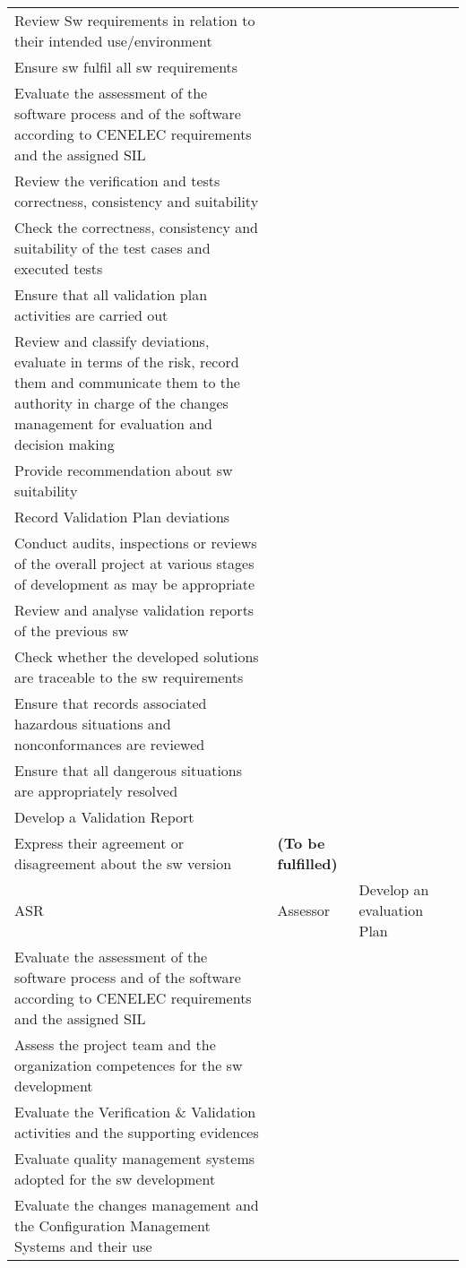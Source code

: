 \documentclass{template/openetcs_article}
\begin{document}
\begin{landscape}
\begin{appendices}
\begin{center}
\begin{longtable}{|m{1cm}|m{}|m{11cm}|m{10cm}|}
Review Sw requirements in relation to their intended use/environment\\
Ensure sw fulfil all sw requirements\\
Evaluate the assessment of the software process and of the software according to CENELEC requirements and the assigned SIL\\
Review the verification and tests correctness, consistency and suitability \\
Check the correctness, consistency and suitability of the test cases and executed tests\\
Ensure that all validation plan activities are carried out\\
Review and classify deviations, evaluate in terms of the risk, record them and communicate them to the authority in charge of the changes management for evaluation and decision making\\ 
Provide recommendation about sw suitability\\
Record Validation Plan deviations\\
Conduct audits, inspections or reviews of the overall project at various stages of development as may be appropriate\\
Review and analyse validation reports of the previous sw\\
Check whether the developed solutions are traceable to the sw requirements \\
Ensure that records associated hazardous situations and nonconformances are reviewed\\
Ensure that all dangerous situations are appropriately resolved\\
Develop a Validation Report\\
Express their agreement or disagreement about the sw version  &
\textbf{(To be fulfilled)}
\\\hline
ASR &
Assessor &
\raggedright
Develop an evaluation Plan\\
Evaluate the assessment of the software process and of the software according to CENELEC requirements and the assigned SIL\\
Assess the project team and the organization competences for the sw development\\
Evaluate the Verification \& Validation activities and the supporting evidences\\
Evaluate quality management systems adopted for  the sw development\\
Evaluate the changes management and the Configuration Management Systems and their use\\

\end{longtable}
\end{center}
\end{appendices}
\end{landscape}
\end{document}
